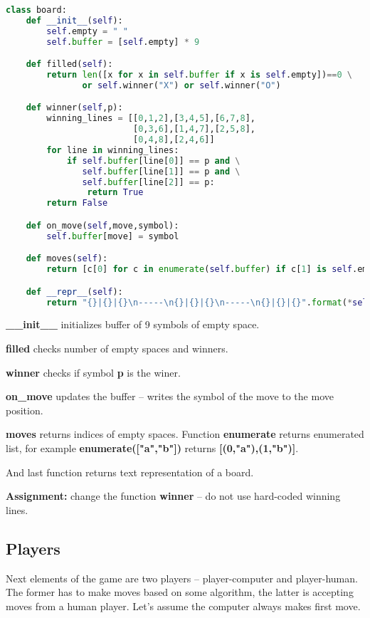 \begin{lstlisting}[language=Python,style=codelst2,caption={Tic-Tac-Toe: board}]
class board:
    def __init__(self):
        self.empty = " "
        self.buffer = [self.empty] * 9

    def filled(self):
        return len([x for x in self.buffer if x is self.empty])==0 \
               or self.winner("X") or self.winner("O")

    def winner(self,p):
        winning_lines = [[0,1,2],[3,4,5],[6,7,8],
                         [0,3,6],[1,4,7],[2,5,8],
                         [0,4,8],[2,4,6]]
        for line in winning_lines:
            if self.buffer[line[0]] == p and \
               self.buffer[line[1]] == p and \
               self.buffer[line[2]] == p:
                return True
        return False

    def on_move(self,move,symbol):
        self.buffer[move] = symbol

    def moves(self):
        return [c[0] for c in enumerate(self.buffer) if c[1] is self.empty]

    def __repr__(self):
        return "{}|{}|{}\n-----\n{}|{}|{}\n-----\n{}|{}|{}".format(*self.buffer)
\end{lstlisting}

\textbf{\_\_init\_\_} initializes buffer of 9 symbols of empty space.

\textbf{filled} checks number of empty spaces and winners.

\textbf{winner} checks if symbol \textbf{p} is the winer.

\textbf{on\_move} updates the buffer -- writes the symbol of the move
to the move position.

\textbf{moves} returns indices of empty spaces. Function \textbf{enumerate}
returns enumerated list, for example \textbf{enumerate(["a","b"])} returns
\textbf{[(0,"a"),(1,"b")]}.

And last function returns text representation of a board.

\begin{tcolorbox}
\textbf{Assignment:} change the function \textbf{winner} -- do not use
hard-coded winning lines.
\end{tcolorbox}

\subsection{Players}

Next elements of the game are two players -- player-computer and
player-human. The former has to make moves based on some algorithm,
the latter is accepting moves from a human player. Let's assume
the computer always makes first move.

